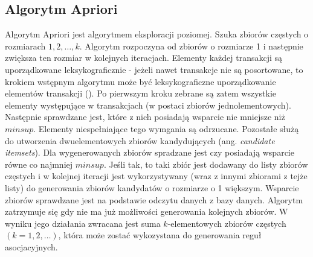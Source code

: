 \subsection{Algorytm Apriori \cite{Agrawal}}
\label{c321}
Algorytm Apriori jest algorytmem eksploracji poziomej. Szuka zbiorów częstych o rozmiarach \(1, 2,\dots , k\). Algorytm rozpoczyna od zbiorów o rozmiarze 1 i następnie zwiększa ten rozmiar w kolejnych iteracjach. Elementy każdej transakcji są uporządkowane leksykograficznie - jeżeli nawet transakcje nie są posortowane, to krokiem wstępnym algorytmu może być leksykograficzne uporządkowanie elementów transakcji (\cite{Morzy}). Po pierwszym kroku zebrane są zatem wszystkie elementy występujące w transakcjach (w postaci zbiorów jednolementowych). Następnie sprawdzane jest, które z nich posiadają wsparcie nie mniejsze niż \(minsup\). Elementy niespełniające tego wymgania są odrzucane. Pozostałe służą do utworzenia dwuelementowych zbiorów kandydujących (ang. \textit{candidate itemsets}). Dla wygenerowanych zbiorów spradzane jest czy posiadają wsparcie równe co najmniej \(minsup\). Jeśli tak, to taki zbiór jest dodawany do listy zbiorów częstych i w kolejnej iteracji jest wykorzystywany (wraz z innymi zbiorami z tejże listy) do generowania zbiorów kandydatów o rozmiarze o 1 większym. Wsparcie zbiorów sprawdzane jest na podstawie odczytu danych z bazy danych. Algorytm zatrzymuje się gdy nie ma już możliwości generowania kolejnych zbiorów. W wyniku jego działania zwracana jest suma \(k\)-elementowych zbiorów częstych \((k = 1, 2,\dots)\), która może zostać wykozystana do generowania reguł asocjacyjnych.

